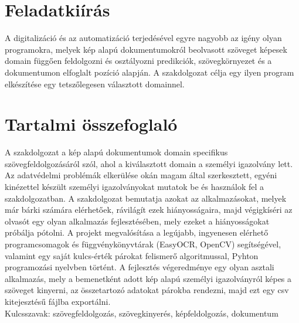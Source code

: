\documentclass[12pt]{report}
\begin{document}
\renewcommand{\contentsname}{Tartalomjegyzék}

\chapter*{Feladatkiírás}

A digitalizáció és az automatizáció terjedésével egyre nagyobb az igény olyan programokra, melyek kép alapú dokumentumokról beolvasott szöveget képesek domain függően feldolgozni és osztályozni predikciók, szövegkörnyezet és a dokumentumon elfoglalt pozíció alapján.
A szakdolgozat célja egy ilyen program elkészítése egy tetszőlegesen választott domainnel.


\chapter*{Tartalmi összefoglaló}

A szakdolgozat a kép alapú dokumentumok domain specifikus szövegfeldolgozásáról szól, ahol a kiválasztott domain a személyi igazolvány lett. Az adatvédelmi problémák elkerülése okán magam által szerkesztett, egyéni kinézettel készült személyi igazolványokat mutatok be és használok fel a szakdolgozatban.
A szakdolgozat bemutatja azokat az alkalmazásokat, melyek már bárki számára elérhetőek, rávilágít ezek hiányosságaira, majd végigkíséri az olvasót egy olyan alkalmazás fejlesztésében, mely ezeket a hiányosságokat próbálja pótolni.
A projekt megvalósítása a legújabb, ingyenesen elérhető programcsomagok és függvénykönyvtárak (EasyOCR, OpenCV) segítségével, valamint egy saját kulcs-érték párokat felismerő algoritmussal, Pyhton programozási nyelvben történt.
A fejlesztés végeredménye egy olyan asztali alkalmazás, mely a bemenetként adott kép alapú személyi igazolványról képes a szöveget kinyerni, az összetartozó adatokat párokba rendezni, majd ezt egy csv kitejesztésű fájlba exportálni. \\

\noindent
Kulcsszavak: szövegfeldolgozás, szövegkinyerés, képfeldolgozás, dokumentum



\end{document}
